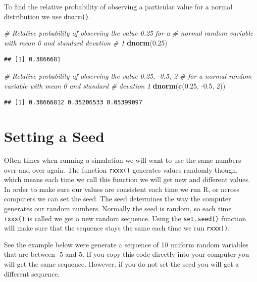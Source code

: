 \documentclass[
]{book}
\newenvironment{Shaded}{\begin{snugshade}}{\end{snugshade}}
\newcommand{\CommentTok}[1]{\textcolor[rgb]{0.56,0.35,0.01}{\textit{#1}}}
\newcommand{\DecValTok}[1]{\textcolor[rgb]{0.00,0.00,0.81}{#1}}
\newcommand{\FloatTok}[1]{\textcolor[rgb]{0.00,0.00,0.81}{#1}}
\newcommand{\KeywordTok}[1]{\textcolor[rgb]{0.13,0.29,0.53}{\textbf{#1}}}
\newcommand{\NormalTok}[1]{#1}
\begin{document}
To find the relative probability of observing a particular value for a normal distribution we use \texttt{dnorm()}.

\begin{Shaded}
\begin{Highlighting}[]
\CommentTok{# Relative probability of observing the value 0.25 for a}
\CommentTok{# normal random variable with mean 0 and standard devation}
\CommentTok{# 1}
\KeywordTok{dnorm}\NormalTok{(}\FloatTok{0.25}\NormalTok{)}
\end{Highlighting}
\end{Shaded}

\begin{verbatim}
## [1] 0.3866681
\end{verbatim}

\begin{Shaded}
\begin{Highlighting}[]
\CommentTok{# Relative probability of observing the value 0.25, -0.5, 2}
\CommentTok{# for a normal random variable with mean 0 and standard}
\CommentTok{# devation 1}
\KeywordTok{dnorm}\NormalTok{(}\KeywordTok{c}\NormalTok{(}\FloatTok{0.25}\NormalTok{, }\FloatTok{-0.5}\NormalTok{, }\DecValTok{2}\NormalTok{))}
\end{Highlighting}
\end{Shaded}

\begin{verbatim}
## [1] 0.38666812 0.35206533 0.05399097
\end{verbatim}

\hypertarget{setting-a-seed}{%
\section{Setting a Seed}\label{setting-a-seed}}

Often times when running a simulation we will want to use the same numbers over and over again. The function \texttt{rxxx()} generates values randomly though, which means each time we call this function we will get new and different values. In order to make sure our values are consistent each time we run R, or across computers we can set the seed. The seed determines the way the computer generates our random numbers. Normally the seed is random, so each time \texttt{rxxx()} is called we get a new random sequence. Using the \texttt{set.seed()} function will make sure that the sequence stays the same each time we run \texttt{rxxx()}.

See the example below were generate a sequence of 10 uniform random variables that are between -5 and 5. If you copy this code directly into your computer you will get the same sequence. However, if you do not set the seed you will get a different sequence.
\end{document}
